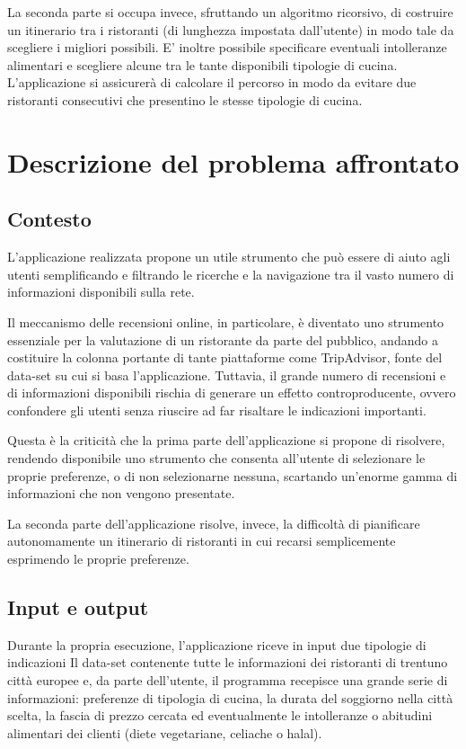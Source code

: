 \documentclass{report}
\begin{document}
La seconda parte si occupa invece, sfruttando un algoritmo ricorsivo, di costruire un itinerario tra i ristoranti (di lunghezza impostata dall'utente) in modo tale da scegliere i migliori possibili. E' inoltre possibile specificare eventuali intolleranze alimentari e scegliere alcune tra le tante disponibili tipologie di cucina. L'applicazione si assicurerà di calcolare il percorso in modo da evitare due ristoranti consecutivi che presentino le stesse tipologie di cucina.


\chapter{Descrizione del problema affrontato}\label{cap_problema}

\section{Contesto}\label{sec_contesto}
L'applicazione realizzata propone un utile strumento che può essere di aiuto agli utenti semplificando e filtrando le ricerche e la navigazione tra il vasto numero di informazioni disponibili sulla rete. 

Il meccanismo delle recensioni online, in particolare, è diventato uno strumento essenziale per la valutazione di un ristorante da parte del pubblico, andando a costituire la colonna portante di tante piattaforme come TripAdvisor, fonte del data-set su cui si basa l'applicazione.
Tuttavia, il grande numero di recensioni e di informazioni disponibili rischia di generare un effetto controproducente, ovvero confondere gli utenti senza riuscire ad far risaltare le indicazioni importanti.

Questa è la criticità che la prima parte dell'applicazione si propone di risolvere, rendendo disponibile uno strumento che consenta all'utente di selezionare le proprie preferenze, o di non selezionarne nessuna, scartando un'enorme gamma di informazioni che non vengono presentate.

La seconda parte dell'applicazione risolve, invece, la difficoltà di pianificare autonomamente un itinerario di ristoranti in cui recarsi semplicemente esprimendo le proprie preferenze. 

\section{Input e output}
Durante la propria esecuzione, l'applicazione riceve in input due tipologie di indicazioni Il data-set contenente tutte le informazioni dei ristoranti di trentuno città europee e, da parte dell'utente, il programma recepisce una grande serie di informazioni: preferenze di tipologia di cucina, la durata del soggiorno nella città scelta, la fascia di prezzo cercata ed eventualmente le intolleranze o abitudini alimentari dei clienti (diete vegetariane, celiache o halal).
\end{document}
